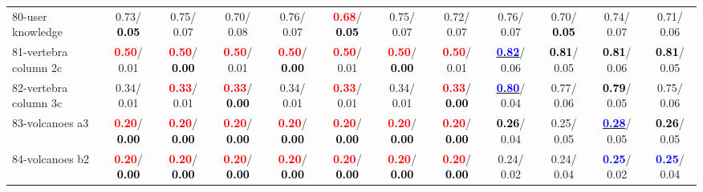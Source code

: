 \begin{table}[h]
\begin{center}
{\begin{tabular}{lc|c|c|c|c|c|c|c|c|c|c}
80-user knowledge &   0.73/\textcolor{black}{\textbf{  0.05}} &   0.75/  0.07 &   0.70/  0.08 &   0.76/  0.07 & \textcolor{red}{\textbf{  0.68}}/\textcolor{black}{\textbf{  0.05}} &   0.75/  0.07 &   0.72/  0.07 &   0.76/  0.07 &   0.70/\textcolor{black}{\textbf{  0.05}} &   0.74/  0.07 &   0.71/  0.06 \\
81-vertebra column 2c & \textcolor{red}{\textbf{  0.50}}/  0.01 & \textcolor{red}{\textbf{  0.50}}/\textcolor{black}{\textbf{  0.00}} & \textcolor{red}{\textbf{  0.50}}/  0.01 & \textcolor{red}{\textbf{  0.50}}/\textcolor{black}{\textbf{  0.00}} & \textcolor{red}{\textbf{  0.50}}/  0.01 & \textcolor{red}{\textbf{  0.50}}/\textcolor{black}{\textbf{  0.00}} & \textcolor{red}{\textbf{  0.50}}/  0.01 & \underline{\textcolor{blue}{\textbf{  0.82}}}/  0.06 & \textcolor{black}{\textbf{  0.81}}/  0.05 & \textcolor{black}{\textbf{  0.81}}/  0.06 & \textcolor{black}{\textbf{  0.81}}/  0.05 \\
82-vertebra column 3c &   0.34/  0.01 & \textcolor{red}{\textbf{  0.33}}/  0.01 & \textcolor{red}{\textbf{  0.33}}/\textcolor{black}{\textbf{  0.00}} &   0.34/  0.01 & \textcolor{red}{\textbf{  0.33}}/  0.01 &   0.34/  0.01 & \textcolor{red}{\textbf{  0.33}}/\textcolor{black}{\textbf{  0.00}} & \underline{\textcolor{blue}{\textbf{  0.80}}}/  0.04 &   0.77/  0.06 & \textcolor{black}{\textbf{  0.79}}/  0.05 &   0.75/  0.06 \\
83-volcanoes a3 & \textcolor{red}{\textbf{  0.20}}/\textcolor{black}{\textbf{  0.00}} & \textcolor{red}{\textbf{  0.20}}/\textcolor{black}{\textbf{  0.00}} & \textcolor{red}{\textbf{  0.20}}/\textcolor{black}{\textbf{  0.00}} & \textcolor{red}{\textbf{  0.20}}/\textcolor{black}{\textbf{  0.00}} & \textcolor{red}{\textbf{  0.20}}/\textcolor{black}{\textbf{  0.00}} & \textcolor{red}{\textbf{  0.20}}/\textcolor{black}{\textbf{  0.00}} & \textcolor{red}{\textbf{  0.20}}/\textcolor{black}{\textbf{  0.00}} & \textcolor{black}{\textbf{  0.26}}/  0.04 &   0.25/  0.05 & \underline{\textcolor{blue}{\textbf{  0.28}}}/  0.05 & \textcolor{black}{\textbf{  0.26}}/  0.05 \\
84-volcanoes b2 & \textcolor{red}{\textbf{  0.20}}/\textcolor{black}{\textbf{  0.00}} & \textcolor{red}{\textbf{  0.20}}/\textcolor{black}{\textbf{  0.00}} & \textcolor{red}{\textbf{  0.20}}/\textcolor{black}{\textbf{  0.00}} & \textcolor{red}{\textbf{  0.20}}/\textcolor{black}{\textbf{  0.00}} & \textcolor{red}{\textbf{  0.20}}/\textcolor{black}{\textbf{  0.00}} & \textcolor{red}{\textbf{  0.20}}/\textcolor{black}{\textbf{  0.00}} & \textcolor{red}{\textbf{  0.20}}/\textcolor{black}{\textbf{  0.00}} &   0.24/  0.02 &   0.24/  0.04 & \textcolor{blue}{\textbf{  0.25}}/  0.02 & \textcolor{blue}{\textbf{  0.25}}/  0.04 \\

\end{tabular}}
\end{center}
\end{table}
